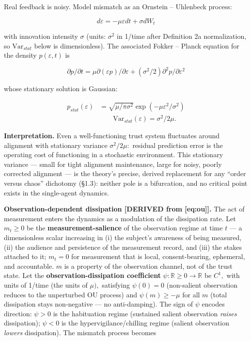 \documentclass[
]{article}
\begin{document}
Real feedback is noisy. Model mismatch as an Ornstein -- Uhlenbeck
process:

\begin{equation}
d\varepsilon = -\mu \varepsilon dt + \sigma dW_t
\label{eq:ou}
\end{equation}

with innovation intensity \(\sigma\) (units: \(\sigma^{2}\) in 1/time
after Definition 2a normalization, so \(\mathrm{Var}_{stat}\) below is
dimensionless). The associated Fokker -- Planck equation for the density
\(p(\varepsilon, t)\) is

\begin{equation}
\partial p/\partial t = \mu \partial(\varepsilon p)/\partial \varepsilon + (\sigma^{2}/2) \partial^{2}p/\partial \varepsilon^{2}
\label{eq:fp}
\end{equation}

whose stationary solution is Gaussian:

\begin{equation}
\begin{split}
p_{stat}(\varepsilon) &= \sqrt{\mu/\pi \sigma^{2}} \exp(-\mu \varepsilon^{2}/\sigma^{2})\\
&\qquad \mathrm{Var}_{stat}(\varepsilon) = \sigma^{2}/2\mu.
\end{split}
\label{eq:stationary}
\end{equation}

\textbf{Interpretation.} Even a well-functioning trust system fluctuates
around alignment with stationary variance \(\sigma^{2}/2\mu:\) residual
prediction error is the operating cost of functioning in a stochastic
environment. This stationary variance --- small for tight alignment
maintenance, large for noisy, poorly corrected alignment --- is the
theory's precise, derived replacement for any ``order versus chaos''
dichotomy (§1.3): neither pole is a bifurcation, and no critical point
exists in the single-agent dynamics.

\textbf{Observation-dependent dissipation {[}DERIVED from
{[}eq:ou{]}{]}.} The act of measurement enters the dynamics as a
modulation of the dissipation rate. Let \(m_t \geq 0\) be the
\textbf{measurement-salience} of the observation regime at time \(t\)
--- a dimensionless scalar increasing in (i) the subject's awareness of
being measured, (ii) the audience and persistence of the measurement
record, and (iii) the stakes attached to it; \(m_t = 0\) for measurement
that is local, consent-bearing, ephemeral, and accountable. \(m\) is a
property of the observation channel, not of the trust state. Let the
\textbf{observation-dissipation coefficient}
\(\psi : \mathbb{R}\geq0 \to \mathbb{R}\) be \(C^{1},\) with units of
1/time (the units of \(\mu),\) satisfying \(\psi(0) = 0\) (non-salient
observation reduces to the unperturbed OU process) and
\(\psi(m) \geq -\mu\) for all \(m\) (total dissipation stays
non-negative --- no anti-damping). The sign of \(\psi\) encodes
direction: \(\psi > 0\) is the habituation regime (sustained salient
observation \emph{raises} dissipation); \(\psi < 0\) is the
hypervigilance/chilling regime (salient observation \emph{lowers}
dissipation). The mismatch process becomes
\end{document}
